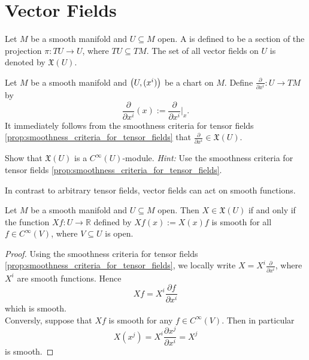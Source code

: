 \section*{Vector Fields}

\begin{definition}
	Let $M$ be a smooth manifold and $U \subseteq M$ open. A  is defined to be a section of the projection $\pi : TU \to U$, where $TU \subseteq TM$. The set of all vector fields on $U$ is denoted by $\mathfrak{X}(U)$.
\end{definition}

\begin{example}
	Let $M$ be a smooth manifold and $\del[1]{U,(x^i)}$ be a chart on $M$. Define $\frac{\partial}{\partial x^i} : U \to TM$ by
	\begin{equation*}
		\frac{\partial}{\partial x^i}(x) := \frac{\partial}{\partial x^i}\bigg\vert_x.
	\end{equation*}
	It immediately follows from the smoothness criteria for tensor fields \ref{prop:smoothness_criteria_for_tensor_fields} that $\frac{\partial}{\partial x^i} \in \mathfrak{X}(U)$.
\end{example}

\begin{exercise}
	Show that $\mathfrak{X}(U)$ is a $C^\infty(U)$-module. \emph{Hint:} Use the smoothness criteria for tensor fields \ref{prop:smoothness_criteria_for_tensor_fields}.
\end{exercise}

In contrast to arbitrary tensor fields, vector fields can act on smooth functions.

\begin{proposition}
	\label{prop:vector_fields_acting_on_functions}
	Let $M$ be a smooth manifold and $U \subseteq M$ open. Then $X \in \mathfrak{X}(U)$ if and only if the function $Xf : U \to \mathbb{R}$ defined by $Xf(x) := X(x)f$ is smooth for all $f \in C^\infty(V)$, where $V \subseteq U$ is open.
\end{proposition}

\begin{proof}
	Using the smoothness criteria for tensor fields \ref{prop:smoothness_criteria_for_tensor_fields}, we locally write $X = X^i\frac{\partial}{\partial x^i}$, where $X^i$ are smooth functions. Hence
	\begin{equation*}
		Xf = X^i\frac{\partial f}{\partial x^i}
	\end{equation*}
	\noindent which is smooth.\\
	Conversly, suppose that $Xf$ is smooth for any $f \in C^\infty(V)$. Then in particular
	\begin{equation*}
		X(x^j) = X^i\frac{\partial x^j}{\partial x^i} = X^j
	\end{equation*}
	\noindent is smooth.
\end{proof}

